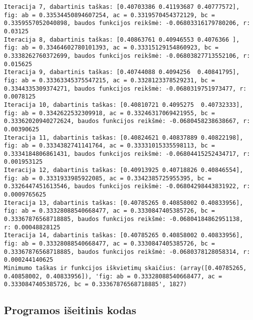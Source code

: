 \documentclass[a4paper,12pt,fleqn]{article}
\begin{document}
\begin{verbatim}
Iteracija 7, dabartinis taškas: [0.40703386 0.41193687 0.40777572], fig: ab = 0.33534450894607254, ac = 0.3319570454372129, bc = 0.3359557052040898, baudos funkcijos reikšmė: -0.06803316179780206, r: 0.03125
Iteracija 8, dabartinis taškas: [0.40863761 0.40946553 0.4076366 ], fig: ab = 0.33464602780101393, ac = 0.33315129154860923, bc = 0.3338262760372699, baudos funkcijos reikšmė: -0.06803827713552106, r: 0.015625
Iteracija 9, dabartinis taškas: [0.40744088 0.4094256  0.40841795], fig: ab = 0.33363345375547215, ac = 0.3328123378529231, bc = 0.3344335309374271, baudos funkcijos reikšmė: -0.0680319751973477, r: 0.0078125
Iteracija 10, dabartinis taškas: [0.40810721 0.4095275  0.40732333], fig: ab = 0.3342622532309918, ac = 0.33246317069421955, bc = 0.33362020940272624, baudos funkcijos reikšmė: -0.0680458238638667, r: 0.00390625
Iteracija 11, dabartinis taškas: [0.40824621 0.40837889 0.40822198], fig: ab = 0.3334382741141764, ac = 0.33331015335598113, bc = 0.3334184806861431, baudos funkcijos reikšmė: -0.06804415252434717, r: 0.001953125
Iteracija 12, dabartinis taškas: [0.40913925 0.40718826 0.40846554], fig: ab = 0.3331933985922085, ac = 0.3342385725955395, bc = 0.3326447451613546, baudos funkcijos reikšmė: -0.06804298443831922, r: 0.0009765625
Iteracija 13, dabartinis taškas: [0.40785265 0.40858002 0.40833956], fig: ab = 0.33328088540668477, ac = 0.3330847405385726, bc = 0.33367876568718885, baudos funkcijos reikšmė: -0.06804184862951138, r: 0.00048828125
Iteracija 14, dabartinis taškas: [0.40785265 0.40858002 0.40833956], fig: ab = 0.33328088540668477, ac = 0.3330847405385726, bc = 0.33367876568718885, baudos funkcijos reikšmė: -0.0680378128058314, r: 0.000244140625
Minimumo taškas ir funkcijos iškvietimų skaičius: (array([0.40785265, 0.40858002, 0.40833956]), 'fig: ab = 0.33328088540668477, ac = 0.3330847405385726, bc = 0.33367876568718885', 1827)

\end{verbatim}

\pagebreak
\subsection{Programos išeitinis kodas}
\end{document}
